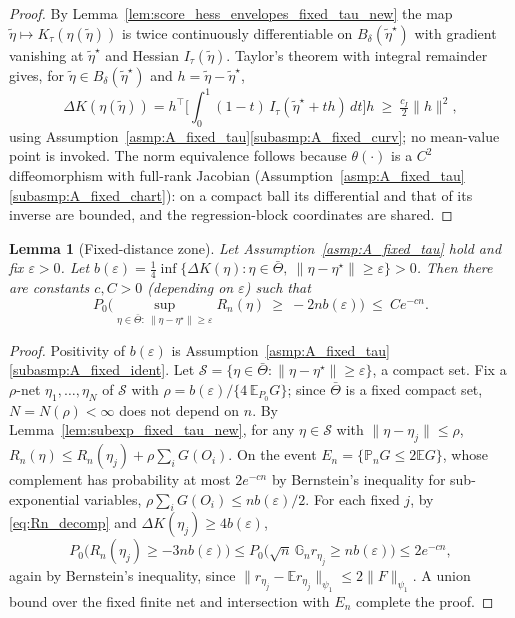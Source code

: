 \documentclass[11pt]{article}
\newtheorem{lemma}{Lemma}
\theoremstyle{definition}
\theoremstyle{plain}
\newcommand{\E}{\mathbb{E}}
\begin{document}
\begin{proof}
By Lemma~\ref{lem:score_hess_envelopes_fixed_tau_new} the map $\tilde\eta\mapsto K_\tau(\eta(\tilde\eta))$ is twice continuously differentiable on $B_\delta(\tilde\eta^\star)$ with gradient vanishing at $\tilde\eta^\star$ and Hessian $I_\tau(\tilde\eta)$. Taylor's theorem with integral remainder gives, for $\tilde\eta\in B_\delta(\tilde\eta^\star)$ and $h=\tilde\eta-\tilde\eta^\star$,
\[
\Delta K(\eta(\tilde\eta))
=h^\top\Big[\int_0^1(1-t)\,I_\tau(\tilde\eta^\star+th)\,dt\Big]h
\ \ge\ \tfrac{c_I}{2}\|h\|^2,
\]
using Assumption~\ref{asmp:A_fixed_tau}\ref{subasmp:A_fixed_curv}; no mean-value point is invoked. The norm equivalence follows because $\theta(\cdot)$ is a $C^2$ diffeomorphism with full-rank Jacobian (Assumption~\ref{asmp:A_fixed_tau}\ref{subasmp:A_fixed_chart}): on a compact ball its differential and that of its inverse are bounded, and the regression-block coordinates are shared.
\end{proof}

\begin{lemma}[Fixed-distance zone]
\label{lem:tests_fixed_tau_new}
Let Assumption~\ref{asmp:A_fixed_tau} hold and fix $\varepsilon>0$. Let
$b(\varepsilon)=\tfrac14\inf\{\Delta K(\eta):\eta\in\bar\Theta,\ \|\eta-\eta^\star\|\ge\varepsilon\}>0$.
Then there are constants $c,C>0$ (depending on $\varepsilon$) such that
\[
P_0\Big(\sup_{\eta\in\bar\Theta:\ \|\eta-\eta^\star\|\ge\varepsilon}R_n(\eta)\ \ge\ -2nb(\varepsilon)\Big)\ \le\ Ce^{-cn}.
\]
\end{lemma}

\begin{proof}
Positivity of $b(\varepsilon)$ is Assumption~\ref{asmp:A_fixed_tau}\ref{subasmp:A_fixed_ident}. Let $\mathcal S=\{\eta\in\bar\Theta:\|\eta-\eta^\star\|\ge\varepsilon\}$, a compact set. Fix a $\rho$-net $\eta_1,\dots,\eta_N$ of $\mathcal S$ with $\rho=b(\varepsilon)/\{4\,\E_{P_0}G\}$; since $\bar\Theta$ is a fixed compact set, $N=N(\rho)<\infty$ does not depend on $n$. By Lemma~\ref{lem:subexp_fixed_tau_new}, for any $\eta\in\mathcal S$ with $\|\eta-\eta_j\|\le\rho$,
$R_n(\eta)\le R_n(\eta_j)+\rho\sum_iG(O_i)$.
On the event $E_n=\{\mathbb P_nG\le2\E G\}$, whose complement has probability at most $2e^{-cn}$ by Bernstein's inequality for sub-exponential variables, $\rho\sum_iG(O_i)\le nb(\varepsilon)/2$. For each fixed $j$, by \eqref{eq:Rn_decomp} and $\Delta K(\eta_j)\ge4b(\varepsilon)$,
\[
P_0\big(R_n(\eta_j)\ge-3nb(\varepsilon)\big)
\le P_0\big(\sqrt n\,\mathbb G_nr_{\eta_j}\ge nb(\varepsilon)\big)\le2e^{-cn},
\]
again by Bernstein's inequality, since $\|r_{\eta_j}-\E r_{\eta_j}\|_{\psi_1}\le2\|F\|_{\psi_1}$. A union bound over the fixed finite net and intersection with $E_n$ complete the proof.
\end{proof}
\end{document}
